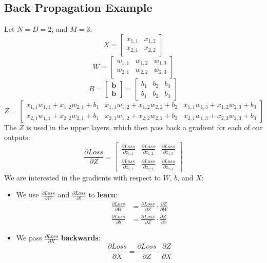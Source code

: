 \documentclass[11pt]{article}
\begin{document}
\subsection{Back Propagation Example}
Let $N = D = 2$, and $M = 3$:
\[
  X = 
  \begin{bmatrix}
    x_{1, 1} & x_{1, 2} \\
    x_{2, 1} & x_{2, 2}
  \end{bmatrix}
\]
\[
  W =
  \begin{bmatrix}
    w_{1, 1} & w_{1, 2} & w_{1, 3} \\
    w_{2, 1} & w_{2, 2} & w_{2, 3}
  \end{bmatrix}
\]
\[
  B = \begin{bmatrix} \textbf{b} \\ \textbf{b} \end{bmatrix} 
  = \begin{bmatrix}
    b_1 & b_2 & b_3 \\
    b_1 & b_2 & b_3
  \end{bmatrix}
\]
\[
  Z = \begin{bmatrix}
    x_{1,1}w_{1,1} + x_{1,2}w_{2,1} + b_1 & 
    x_{1,1}w_{1,2} + x_{1,2}w_{2,2} + b_2 &
    x_{1,1}w_{1,3} + x_{1,2}w_{2,3} + b_3 \\
    x_{2,1}w_{1,1} + x_{2,2}w_{2,1} + b_1 & 
    x_{2,1}w_{1,2} + x_{2,2}w_{2,2} + b_2 &
    x_{2,1}w_{1,3} + x_{2,2}w_{2,3} + b_3
  \end{bmatrix}
\]
The $Z$ is used in the upper layers, which then pass back a gradient for each of our outputs:
\[
  \frac{\partial Loss}{\partial Z} = \begin{bmatrix}
    \frac{\partial Loss}{\partial z_{1, 1}} &
    \frac{\partial Loss}{\partial z_{1, 2}} &
    \frac{\partial Loss}{\partial z_{1, 3}} \\
    \frac{\partial Loss}{\partial z_{2, 1}} &
    \frac{\partial Loss}{\partial z_{2, 2}} &
    \frac{\partial Loss}{\partial z_{2, 3}}
  \end{bmatrix}
\]
We are interested in the gradients with respect to $W$, $b$, and $X$:
\begin{itemize}
  \item We use $\frac{\partial Loss}{\partial W}$ and $\frac{\partial Loss}{\partial b}$ to \textbf{learn}:
    \begin{align*}
      \frac{\partial Loss}{\partial W} &= \frac{\partial Loss}{\partial Z} \cdot \frac{\partial Z}{\partial W} \\
      \frac{\partial Loss}{\partial b} &= \frac{\partial Loss}{\partial Z} \cdot \frac{\partial Z}{\partial b}
    \end{align*}
  \item We pass $\frac{\partial Loss}{\partial X}$ \textbf{backwards}:
    \[
      \frac{\partial Loss}{\partial X} = \frac{\partial Loss}{\partial Z} \cdot \frac{\partial Z}{\partial X}
    \]
\end{itemize}
\end{document}
